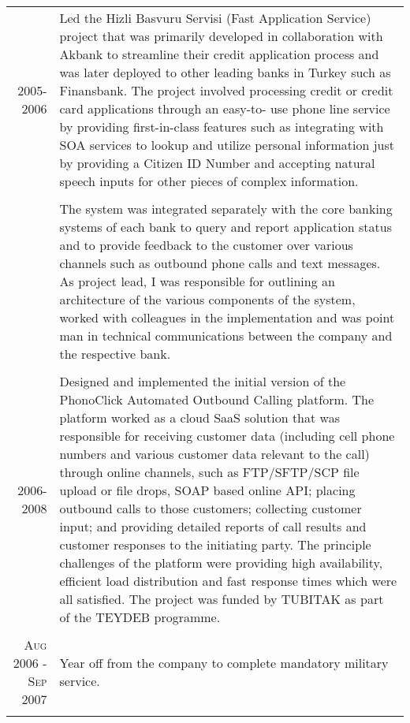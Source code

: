 \documentclass[a4paper,10pt]{article}
\begin{document}
\begin{longtable}{r|p{11cm}}
  \textsc{2005-2006}            & Led the Hizli Basvuru Servisi (Fast Application Service) project that was primarily developed in collaboration with Akbank to streamline their credit application process and was later deployed to other leading banks in Turkey such as Finansbank. The project involved processing credit or credit card applications through an easy-to- use phone line service by providing first-in-class features such as integrating with SOA services to lookup and utilize personal information just by providing a Citizen ID Number and accepting natural speech inputs for other pieces of complex information. \\
                                & \\
                                & The system was integrated separately with the core banking systems of each bank to query and report application status and to provide feedback to the customer over various channels such as outbound phone calls and text messages. As project lead, I was responsible for outlining an architecture of the various components of the system, worked with colleagues in the implementation and was point man in technical communications between the company and the respective bank. \\
  \multicolumn{2}{c}{} \\


  \textsc{2006-2008}            & Designed and implemented the initial version of the PhonoClick Automated Outbound Calling platform. The platform worked as a cloud SaaS solution that was responsible for receiving customer data (including cell phone numbers and various customer data relevant to the call) through online channels, such as FTP/SFTP/SCP file upload or file drops, SOAP based online API; placing outbound calls to those customers; collecting customer input; and providing detailed reports of call results and customer responses to the initiating party. The principle challenges of the platform were providing high availability, efficient load distribution and fast response times which were all satisfied. The project was funded by TUBITAK as part of the TEYDEB programme. \\
  \multicolumn{2}{c}{} \\


  \textsc{Aug 2006 - Sep 2007}  & Year off from the company to complete mandatory military service. \\
  \multicolumn{2}{c}{} \\



\end{longtable}
\end{document}
